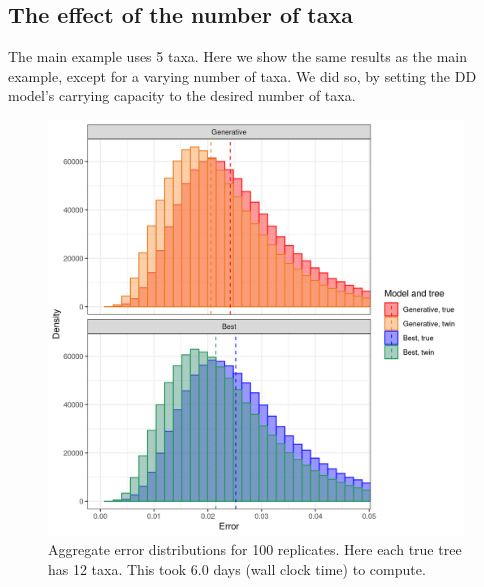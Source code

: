 \newpage

\subsection{The effect of the number of taxa}
\label{subsec:n_taxa}

The main example uses 5 taxa. Here we show the same results as the main example,
except for a varying number of taxa. We did so, by setting the DD model's
carrying capacity to the desired number of taxa.

\begin{figure}[H]
  \includegraphics[width=0.98\textwidth]{pirouette_example_32/errors.png}
  \caption{Aggregate error distributions for 100 replicates. Here each true tree has 12 taxa. This took 6.0 days (wall clock time) to compute.}
  \label{fig:example_12_taxa}
\end{figure}

